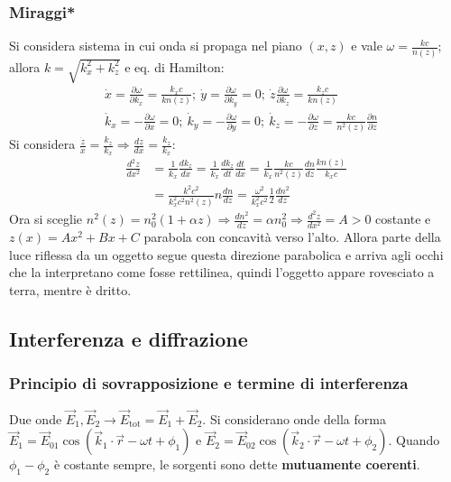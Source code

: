 \documentclass[10pt, a4paper]{scrartcl}
\numberwithin{equation}{subsection}
\theoremstyle{style1}
\begin{document}
\subsubsection{Miraggi*}

Si considera sistema in cui onda si propaga nel piano $(x,z)$ e vale $\omega = \frac{k c}{n(z)}$; allora $k=\sqrt{k_x^2 + k_z^2} $ e eq. di Hamilton:
\begin{equation}
	\begin{split}
		&\dot{x}= \frac{\partial \omega}{\partial k_x} = \frac{k_x c }{k n(z)}; \ \dot{y}= \frac{\partial \omega}{\partial k_y} =0; \ \dot{z } \frac{\partial \omega}{\partial k_z} = \frac{k_z c}{k n(z)}\\
		&\dot{k}_x = - \frac{\partial \omega}{\partial x} = 0; \ \dot{k}_y = - \frac{\partial \omega}{\partial y} =0; \ \dot{k}_z= -\frac{\partial \omega}{\partial z} = \frac{kc}{n^2 (z)}\frac{\partial n}{\partial z} 
	\end{split}
\end{equation}
Si considera $\frac{\dot{z}}{\dot{x}} = \frac{k_z}{k_x}\Rightarrow \frac{d z}{d x} = \frac{k_z}{k_x}$:
\[
\begin{split}
	\frac{d ^2 z}{d x^2} &= \frac{1}{k_x} \frac{d k_z}{d x} =\frac{1}{k_x}\frac{d k_z}{d t} \frac{d t}{d x} = \frac{1}{k_x}\frac{kc}{n^2(z)}\frac{d n}{d z} \frac{kn(z)}{k_x c} \\
			     &= \frac{k^2 c^2}{k_x^2 c^2 n^2(z)} n\frac{d n}{d z} = \frac{\omega^2}{k_x^2 c^2} \frac{1}{2}\frac{d n^2}{d z} 
\end{split}
\] 
Ora si sceglie $n^2(z) = n_0^2 (1+\alpha z)\Rightarrow \frac{d n^2}{d z} = \alpha n_0^2 \Rightarrow \frac{d ^2z}{d x^2} =A>0$ costante e $z(x) = Ax^2 + Bx + C$ parabola con concavit\`a verso l'alto. Allora parte della luce riflessa da un oggetto segue questa direzione parabolica e arriva agli occhi che la interpretano come fosse rettilinea, quindi l'oggetto appare rovesciato a terra, mentre \`e dritto.
\subsection{Interferenza e diffrazione}

\subsubsection{Principio di sovrapposizione e termine di interferenza}

Due onde $\vec{E}_1, \vec{E}_2\to \vec{E}_\text{tot} = \vec{E}_1 + \vec{E}_2$. Si considerano onde della forma $\vec{E}_1 = \vec{E}_{01} \cos(\vec{k}_1\cdot \vec{r}-\omega t+ \phi _1)$ e $\vec{E}_2 = \vec{E}_{02} \cos(\vec{k}_2 \cdot \vec{r}-\omega t + \phi _2)$. Quando $\phi _1 - \phi _2$ \`e costante sempre, le sorgenti sono dette \textbf{mutuamente coerenti}.
\end{document}
